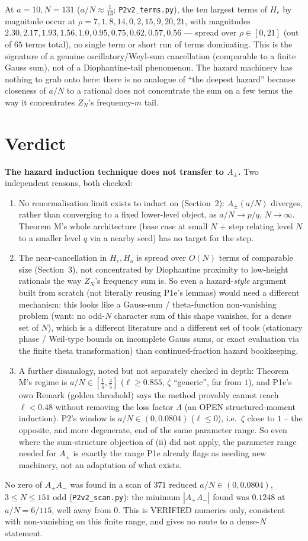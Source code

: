 \documentclass[11pt]{article}
\theoremstyle{remark}\newtheorem{remark}[theorem]{Remark}
\begin{document}
At $a=10,N=131$ ($a/N\approx\frac1{13}$; \texttt{P2v2\_terms.py}), the ten largest terms of $H_e$ by magnitude occur at
$\rho=7,1,8,14,0,2,15,9,20,21$, with magnitudes $2.30,2.17,1.93,1.56,1.0,0.95,0.75,0.62,0.57,0.56$ --- spread over $\rho\in[0,21]$
(out of $65$ terms total), no single term or short run of terms dominating. This is the signature of a genuine
oscillatory/Weyl-sum cancellation (comparable to a finite Gauss sum), not of a Diophantine-tail phenomenon. The hazard machinery
has nothing to grab onto here: there is no analogue of ``the deepest hazard'' because closeness of $a/N$ to a rational does not
concentrate the sum on a few terms the way it concentrates $Z_N$'s frequency-$m$ tail.

\section{Verdict}
\textbf{The hazard induction technique does not transfer to $A_\pm$.} Two independent reasons, both checked:
\begin{enumerate}
\item[(i)] No renormalisation limit exists to induct on (Section~2): $A_\pm(a/N)$ diverges, rather than converging to a
fixed lower-level object, as $a/N\to p/q$, $N\to\infty$. Theorem M's whole architecture (base case at small $N$ + step relating
level $N$ to a smaller level $q$ via a nearby seed) has no target for the step.
\item[(ii)] The near-cancellation in $H_e,H_o$ is spread over $O(N)$ terms of comparable size (Section~3), not concentrated by
Diophantine proximity to low-height rationals the way $Z_N$'s frequency sum is. So even a hazard-\emph{style} argument built from
scratch (not literally reusing P1e's lemmas) would need a different mechanism: this looks like a Gauss-sum / theta-function
non-vanishing problem (want: no odd-$N$ character sum of this shape vanishes, for a dense set of $N$), which is a different
literature and a different set of tools (stationary phase / Weil-type bounds on incomplete Gauss sums, or exact evaluation via
the finite theta transformation) than continued-fraction hazard bookkeeping.
\item[(iii)] A further disanalogy, noted but not separately checked in depth: Theorem M's regime is $a/N\in[\frac15,\frac45]$
($\ell\ge0.855$, $\zeta$ ``generic'', far from $1$), and P1e's own Remark (golden threshold) says the method provably cannot reach
$\ell<0.48$ without removing the loss factor $\Lambda$ (an OPEN structured-moment induction). P2's window is $a/N\in(0,0.0804)$
($\ell\le0$), i.e.\ $\zeta$ close to $1$ -- the opposite, and more degenerate, end of the same parameter range. So even where the
sum-structure objection of (ii) did not apply, the parameter range needed for $A_\pm$ is exactly the range P1e already
flags as needing new machinery, not an adaptation of what exists.
\end{enumerate}
No zero of $A_+A_-$ was found in a scan of $371$ reduced $a/N\in(0,0.0804)$, $3\le N\le151$ odd (\texttt{P2v2\_scan.py}): the
minimum $|A_+A_-|$ found was $0.1248$ at $a/N=6/115$, well away from $0$. This is VERIFIED numerics only, consistent with
non-vanishing on this finite range, and gives no route to a dense-$N$ statement.
\end{document}
